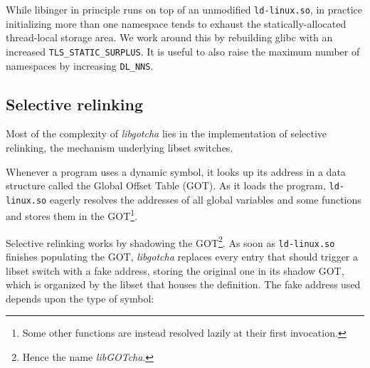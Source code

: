 
While libinger in principle runs on top of an unmodified \texttt{ld-linux.so}, in
practice initializing more than one namespace tends to exhaust the
statically-allocated thread-local storage area.  We work around this by rebuilding
glibc with an increased \texttt{TLS\_STATIC\_SURPLUS}.  It is useful to also raise
the maximum number of namespaces by increasing \texttt{DL\_NNS}.





\subsection{Selective relinking}

Most of the complexity of \textit{libgotcha} lies in the implementation of selective
relinking, the mechanism underlying libset switches.

Whenever a program uses a dynamic symbol, it looks up its address in a data structure
called the Global Offset Table (GOT).  As it loads the program, \texttt{ld-linux.so}
eagerly resolves the addresses of all global variables and some functions and stores
them in the GOT\footnote{Some other functions are instead resolved lazily at their
first invocation.}.

Selective relinking works by shadowing the GOT\footnote{Hence the name
\textit{libGOTcha}.}.  As soon as \texttt{ld-linux.so} finishes populating
the GOT, \textit{libgotcha} replaces every entry that should trigger a libset switch
with a fake address, storing the original one in its shadow GOT, which is organized
by the libset that houses the definition.  The fake address used depends upon the
type of symbol:



